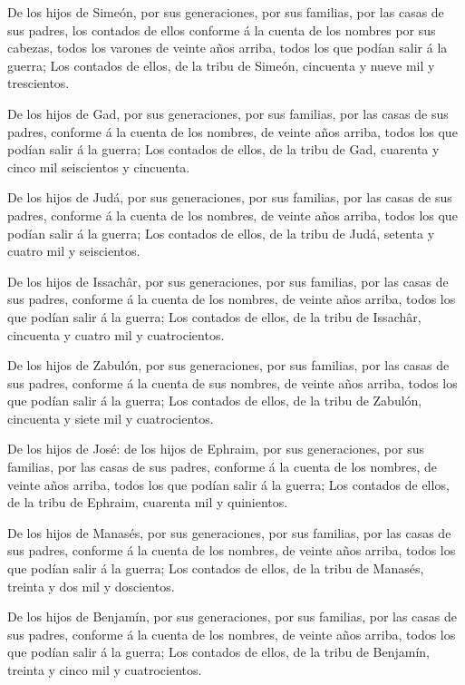  De los hijos de Simeón, por sus generaciones, por sus
familias, por las casas de sus padres, los contados de ellos conforme á
la cuenta de los nombres por sus cabezas, todos los varones de veinte
años arriba, todos los que podían salir á la guerra;  Los
contados de ellos, de la tribu de Simeón, cincuenta y nueve mil y
trescientos.

 De los hijos de Gad, por sus generaciones, por sus
familias, por las casas de sus padres, conforme á la cuenta de los
nombres, de veinte años arriba, todos los que podían salir á la guerra;
 Los contados de ellos, de la tribu de Gad, cuarenta y
cinco mil seiscientos y cincuenta.

 De los hijos de Judá, por sus generaciones, por sus
familias, por las casas de sus padres, conforme á la cuenta de los
nombres, de veinte años arriba, todos los que podían salir á la guerra;
 Los contados de ellos, de la tribu de Judá, setenta y
cuatro mil y seiscientos.

 De los hijos de Issachâr, por sus generaciones, por sus
familias, por las casas de sus padres, conforme á la cuenta de los
nombres, de veinte años arriba, todos los que podían salir á la guerra;
 Los contados de ellos, de la tribu de Issachâr, cincuenta
y cuatro mil y cuatrocientos.

 De los hijos de Zabulón, por sus generaciones, por sus
familias, por las casas de sus padres, conforme á la cuenta de sus
nombres, de veinte años arriba, todos los que podían salir á la guerra;
 Los contados de ellos, de la tribu de Zabulón, cincuenta y
siete mil y cuatrocientos.

 De los hijos de José: de los hijos de Ephraim, por sus
generaciones, por sus familias, por las casas de sus padres, conforme á
la cuenta de los nombres, de veinte años arriba, todos los que podían
salir á la guerra;  Los contados de ellos, de la tribu de
Ephraim, cuarenta mil y quinientos.

 De los hijos de Manasés, por sus generaciones, por sus
familias, por las casas de sus padres, conforme á la cuenta de los
nombres, de veinte años arriba, todos los que podían salir á la guerra;
 Los contados de ellos, de la tribu de Manasés, treinta y
dos mil y doscientos.

 De los hijos de Benjamín, por sus generaciones, por sus
familias, por las casas de sus padres, conforme á la cuenta de los
nombres, de veinte años arriba, todos los que podían salir á la guerra;
 Los contados de ellos, de la tribu de Benjamín, treinta y
cinco mil y cuatrocientos.

